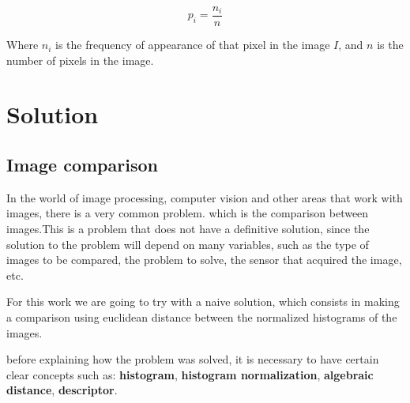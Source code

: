 \documentclass[journal]{IEEEtran}
\begin{document}
\begin{equation}
\label{eq:probability}
p_i =  \frac{n_i}{n}
\end{equation}

Where $ n_i $ is the frequency of appearance of that pixel in the image $ I $, and $ n $ is the number of pixels in the image.

\section{Solution}

\subsection{Image comparison}

In the world of image processing, computer vision and other areas that work with images, there is a very common problem. which is the comparison between images.This is a problem that does not have a definitive solution, since the solution to the problem will depend on many variables, such as the type of images to be compared, the problem to solve, the sensor that acquired the image, etc.

For this work we are going to try with a naive solution, which consists in making a comparison using euclidean distance between the normalized histograms of the images.

before explaining how the problem was solved, it is necessary to have certain clear concepts such as: \textbf{histogram}, \textbf{histogram normalization}, \textbf{algebraic distance}, \textbf{descriptor}.
\end{document}
